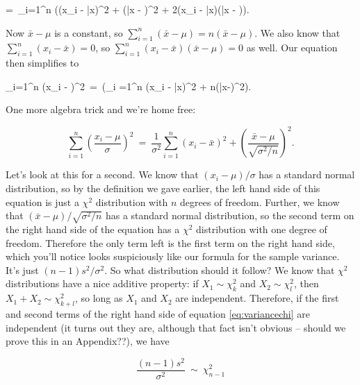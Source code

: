 =\ \sum_{i=1}^n \left((x_i - \bar{x})^2 + (\bar{x} - \mu)^2 + 2(x_i - \bar{x})(\bar{x} - \mu)\right).

\eel

Now $\bar{x} - \mu$ is a constant, so $\sum_{i=1}^n (\bar{x} - \mu) = n(\bar{x} - \mu)$.  We also know that $\sum_{i=1}^n (x_i - \bar{x}) = 0$, so $\sum_{i = 1}^n (x_i - \bar{x})(\bar{x} - \mu) = 0$ as well.  Our equation then simplifies to

\bel

\sum_{i=1}^n \left(x_i - \mu\right)^2\ =\ \left(\sum_{i =1}^n \left(x_i - \bar{x}\right)^2 + n\left(\bar{x}-\mu\right)^2\right).

\eel

One more algebra trick and we're home free:



\begin{equation}\label{eq:variancechi}

\sum_{i=1}^n \left(\frac{x_i - \mu}{\sigma}\right)^2\ =\ \frac{1}{\sigma^2}\sum_{i =1}^n \left(x_i - \bar{x}\right)^2 + \left(\frac{\bar{x}-\mu}{\sqrt{\sigma^2/n}}\right)^2.

\end{equation}

Let's look at this for a second.  We know that $(x_i - \mu)/\sigma$ has a standard normal distribution, so by the definition we gave earlier, the left hand side of this equation is just a $\chi^2$ distribution with $n$ degrees of freedom.  Further, we know that $(\bar{x} - \mu)/\sqrt{\sigma^2/n}$ has a standard normal distribution, so the second term on the right hand side of the equation has a $\chi^2$ distribution with one degree of freedom.  Therefore the only term left is the first term on the right hand side, which you'll notice looks suspiciously like our formula for the sample variance.  It's just $(n-1)s^2/\sigma^2$.  So what distribution should it follow?  We know that $\chi^2$ distributions have a nice additive property: if $X_1 \sim \chi^2_k$ and $X_2 \sim \chi^2_l$, then $X_1 + X_2 \sim \chi^2_{k+l}$, so long as $X_1$ and $X_2$ are independent.  Therefore, if the first and second terms of the right hand side of equation \ref{eq:variancechi} are independent (it turns out they are, although that fact isn't obvious -- should we prove this in an Appendix??), we have 



\begin{equation} \label{eq:sampvardist}

\frac{(n-1)s^2}{\sigma^2} \ \sim \  \chi^2_{n-1}

\end{equation}



